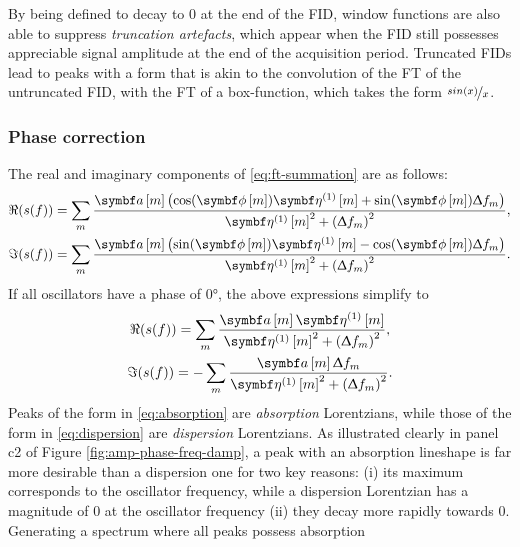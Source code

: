 By being defined to decay to $0$ at the end of the \ac{FID}, window functions
are also able to suppress \emph{truncation artefacts}, which appear when the
\ac{FID} still possesses appreciable signal amplitude at the end of the
acquisition period. Truncated \acp{FID} lead to peaks with a form that is akin
to the convolution of the \ac{FT} of the untruncated \ac{FID}, with the
\ac{FT} of a box-function, which takes the form $\nicefrac{sin(x)}{x}$.

\subsubsection{Phase correction}
The real and imaginary components of \eqref{eq:ft-summation} are as follows:
\begin{subequations}
    \begin{gather}
        \Re(s(f)) = \sum_m
        \frac{\bdam \left(\cos(\bdphim) \bdetaonem + \sin(\bdphim) \Updelta f_m\right)}
        {\bdetaonem^2 + \left( \Updelta f_m \right)^2},\\
        \Im(s(f)) = \sum_m
        \frac{\bdam \left(\sin(\bdphim) \bdetaonem - \cos(\bdphim) \Updelta f_m\right)}
        {\bdetaonem^2 + \left( \Updelta f_m \right)^2}.
    \end{gather}
\end{subequations}
If all oscillators have a phase of \ang{0}, the above expressions simplify to
\begin{subequations}
    \begin{gather}
        \Re(s(f)) = \sum_m
        \frac{\bdam \bdetaonem}
        {\bdetaonem^2 + \left( \Updelta f_m \right)^2},
        \label{eq:absorption}\\
        \Im(s(f)) = -\sum_m
        \frac{\bdam \Updelta f_m}
        {\bdetaonem^2 + \left( \Updelta f_m \right)^2}.
        \label{eq:dispersion}
    \end{gather}
\end{subequations}
Peaks of the form in \eqref{eq:absorption} are \emph{absorption} Lorentzians,
while those of the form in \eqref{eq:dispersion} are \emph{dispersion}
Lorentzians. As illustrated clearly in panel c2 of Figure
\ref{fig:amp-phase-freq-damp}, a peak with an absorption lineshape is far more
desirable than a dispersion one for two key reasons: (i) its maximum
corresponds to the oscillator frequency, while a dispersion Lorentzian
has a magnitude of $0$ at the oscillator frequency (ii) they decay more rapidly
towards $0$. Generating a spectrum where all peaks possess absorption
